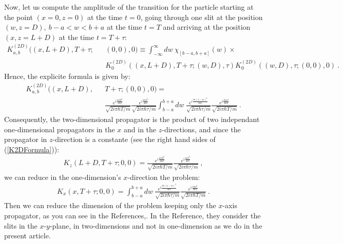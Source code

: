 \documentclass[12pt,aps,prb,preprint]{revtex4-1}   %
\begin{document}
Now, let us compute the amplitude of the transition for the particle 
starting at the point $(x=0,z=0)$ at the time $t=0$,
going through one slit at the position $(w,z=D),\ b-a<w<b+a$ at the time $t=T$
and arriving at the position $(x,z=L+D)$ at the time $t=T+\tau$: 
\begin{eqnarray*}
K_{a,b}^{(2D)}((x,L+D),T+\tau;&&(0,0),0)
\equiv\int_{-\infty}^{\infty}dw\ \chi_{[b-a,b+a]}(w)\times
{}\nonumber\\{}&&K_0^{(2D)}\left((x,L+D),T+\tau;(w,D),\tau\right)K_0^{(2D)}\left((w,D),\tau;(0,0),0\right)\ .
\end{eqnarray*}
Hence, the explicite formula is given by:
\begin{eqnarray}\label{K2DFormula}
K_{a,b}^{(2D)}((x,L+D),&&T+\tau;(0,0),0)=
{}\nonumber\\{}&&\frac{e^{i\frac{mD^2}{2\hbar T}}}{\sqrt{2i\pi\hbar T/m}} 
\frac{e^{i\frac{m L^2}{2\hbar\tau}}}{\sqrt{2i\pi\hbar\tau/m}}
\int_{b-a}^{b+a}dw\ \frac{e^{i\frac{m (x-w)^2}{2\hbar\tau}}}{\sqrt{2i\pi\hbar\tau/m}}
\frac{e^{i\frac{m w^2}{2\hbar T}}}{\sqrt{2i\pi\hbar T/m}}\ .
\end{eqnarray}
Consequently, the two-dimensional propagator is the product of two independant 
one-dimensional propagators in the $x$ and in the $z$-directions, 
and since the propagator in $z$-direction is a constante 
(see the right hand sides of (\ref{K2DFormula})):
\begin{eqnarray}\label{Kz}
K_z(L+D,T+\tau;0,0)=\frac{e^{i\frac{mD^2}{2\hbar T}}}{\sqrt{2i\pi\hbar T/m}}
\frac{e^{i\frac{m L^2}{2\hbar\tau}}}{\sqrt{2i\pi\hbar\tau/m}}\ ,
\end{eqnarray}
we can reduce in the one-dimension's $x$-direction the problem:
\begin{eqnarray}\label{Kx}
K_x(x,T+\tau;0,0)=\int_{b-a}^{b+a}dw\ \frac{e^{i\frac{m (x-w)^2}{2\hbar\tau}}}{\sqrt{2i\pi\hbar\tau/m}}
\frac{e^{i\frac{m w^2}{2\hbar T}}}{\sqrt{2i\pi\hbar T/m}}\ .
\end{eqnarray}
Then we can reduce the dimension of the problem keeping only the $x$-axis
propagator, as you can see in the References\cite{FH},\cite{Frabboni}.
In the Reference,\cite{Frabboni} they consider the slits in 
the $x$-$y$-plane, in two-dimensions and not in one-dimension 
as we do in the present article.\\
\end{document}
